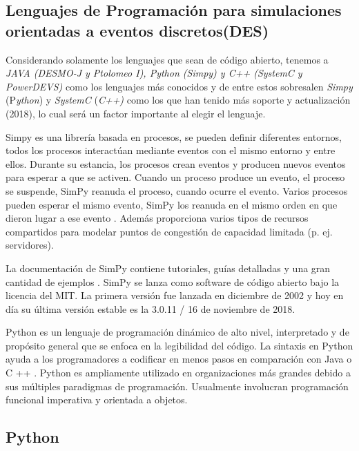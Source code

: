 \subsection{Lenguajes de Programación para simulaciones orientadas a eventos discretos(DES)}

Considerando solamente los lenguajes que sean de código abierto, tenemos a \textit{JAVA (DESMO-J y Ptolomeo I), Python (Simpy) y C++ (SystemC y PowerDEVS)} como los lenguajes más conocidos y de entre estos sobresalen \textit{Simpy }(P\textit{ython}) y \textit{SystemC }(\textit{C++) }como los que han tenido más soporte y actualización (2018), lo cual será un factor importante al elegir el lenguaje.\newline

Simpy es una librería basada en procesos, se pueden definir diferentes entornos, todos los procesos interactúan mediante eventos con el mismo entorno y entre ellos. Durante su estancia, los procesos crean eventos y producen nuevos eventos para esperar a que se activen. Cuando un proceso produce un evento, el proceso se suspende, SimPy reanuda el proceso, cuando ocurre el evento. Varios procesos pueden esperar el mismo evento, SimPy los reanuda en el mismo orden en que dieron lugar a ese evento \parencite{Simpy}. Además proporciona varios tipos de recursos compartidos para modelar puntos de congestión de capacidad limitada (p. ej. servidores).\newline

La documentación de SimPy contiene tutoriales, guías detalladas y una gran cantidad de ejemplos \parencite{Simpy}. SimPy se lanza como software de código abierto bajo la licencia del MIT. La primera versión fue lanzada en diciembre de 2002 y hoy en día su última versión estable es la 3.0.11 / 16 de noviembre de 2018.\newline

Python es un lenguaje de programación dinámico de alto nivel, interpretado y de propósito general que se enfoca en la legibilidad del código. La sintaxis en Python ayuda a los programadores a codificar en menos pasos en comparación con Java o C ++ \parencite{PythonVentajas}. Python es ampliamente utilizado en organizaciones más grandes debido a sus múltiples paradigmas de programación. Usualmente involucran programación funcional imperativa y orientada a objetos. \newline

\subsection{Python}

